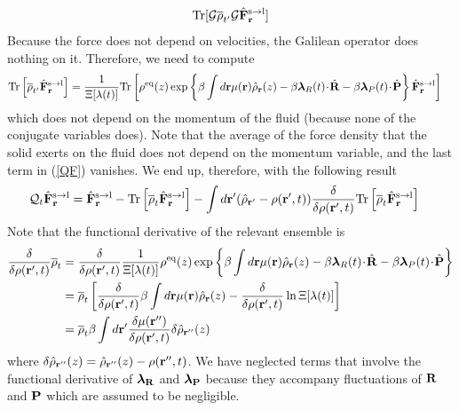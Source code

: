 \documentclass[b5paper,openright,11pt]{book}
\newcommand{\esc}{\!\cdot\!}
\begin{document}
\begin{appendices}
\begin{align}
  {\rm Tr}[{\cal G}\overline{\rho}_{t'} {\cal G} \hat{\bf F}^{\rm s\to l}_{{\bf r}}]
\end{align}
Because the force does not depend on velocities, the Galilean operator does nothing on it.
Therefore, we need to compute 
\begin{align}
    {\rm Tr}\left[\overline{\rho}_{t'}  \hat{\bf F}^{\rm s\to l}_{{\bf r}}\right]&=
\frac{1}{\Xi[\lambda(t)]}    {\rm Tr}\left[\rho^{\rm eq}(z)
\exp\left\{\beta\int d{\bf r}\mu({\bf r})\hat{\rho}_{\bf r}(z)
-\beta \boldsymbol{\lambda}_{R}(t)\esc\hat{\bf R}
-\beta \boldsymbol{\lambda}_{P}(t)\esc\hat{\bf P}\right\}
 \hat{\bf F}^{\rm s\to l}_{{\bf r}}\right]
\label{nogal}
\end{align}
which does  not depend on the  momentum of the fluid  (because none of
the  conjugate  variables does).   
Note that the average  of the force density  that the solid exerts  on the fluid
does  not depend  on  the  momentum variable,  and  the  last term  in
(\ref{QF}) vanishes. We end up, therefore, with the following result
\begin{align}
  {\cal Q}_t\hat{\bf F}^{\rm s\to l}_{{\bf r}}&=
\hat{\bf F}^{\rm s\to l}_{{\bf r}}- {\rm Tr}\left[\overline{\rho}_{t} \hat{\bf F}^{\rm s\to l}_{{\bf r}}\right]
-\int d{\bf r}'(\hat{\rho}_{{\bf r}'}-\rho({\bf r}',t))
\frac{\delta}{\delta \rho({\bf r}',t)}{\rm Tr}\left[\overline{\rho}_{t} \hat{\bf F}^{\rm s\to l}_{{\bf r}}\right]
\label{QF1}
\end{align}
Note that the functional derivative of the relevant ensemble is
\begin{align}
\frac{\delta}{\delta {\rho}({\bf r}',t)}\overline{\rho}_{t} &=
\frac{\delta}{\delta {\rho}({\bf r}',t)}
\frac{1}{\Xi[\lambda(t)]}   \rho^{\rm eq}(z)
\exp\left\{\beta\int d{\bf r}\mu({\bf r})\hat{\rho}_{\bf r}(z)
-\beta \boldsymbol{\lambda}_{R}(t)\esc\hat{\bf R}
-\beta \boldsymbol{\lambda}_{P}(t)\esc\hat{\bf P}\right\}
\nonumber\\
&=
\overline{\rho}_{t}\left[\frac{\delta}{\delta {\rho}({\bf r}',t)}\beta \int d{\bf r}\mu({\bf r})\hat{\rho}_{\bf r}(z)-\frac{\delta}{\delta{\rho}({\bf r}',t)}\ln \Xi[\lambda(t)]\right]
\nonumber\\
&=
\overline{\rho}_{t}\beta \int d{\bf r}'\frac{\delta \mu({\bf r}'')}{\delta {\rho}({\bf r}',t)}\delta\hat{\rho}_{{\bf r}''}(z)
\label{funcder}
\end{align}
where $\delta\hat{\rho}_{{\bf r}''}(z)=\hat{\rho}_{{\bf r}''}(z)-\rho({\bf r}'',t)$.
We have neglected terms that involve the functional derivative of $\boldsymbol{\lambda}_{\bf R}$ and $\boldsymbol{\lambda}_{\bf P}$ because they accompany fluctuations of ${\bf R}$ and ${\bf P}$ which are assumed to be negligible.


\end{appendices}
\end{document}
